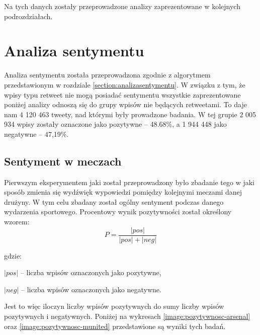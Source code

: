 Na tych danych zostały przeprowadzone analizy zaprezentowane w kolejnych podrozdziałach.













\section{Analiza sentymentu}
\label{section:analizasentymentu2}

Analiza sentymentu została przeprowadzona zgodnie z algorytmem przedstawionym w
rozdziale \ref{section:analizasentymentu}. W związku z tym, że wpisy typu
retweet nie mogą posiadać sentymentu wszystkie zaprezentowane poniżej analizy
odnoszą się do grupy wpisów nie będących retweetami. To daje nam 4 120 463
tweety, nad którymi były prowadzone badania. W tej grupie 2 005 934 wpisy
zostały oznaczone jako pozytywne -- 48.68\%, a 1 944 448 jako negatywne --
47,19\%.



\subsection{Sentyment w meczach}
Pierwszym eksperymentem jaki został przeprowadzony było zbadanie tego w jaki 
sposób zmienia się wydźwięk wypowiedzi pomiędzy kolejnymi meczami danej drużyny.
W tym celu zbadany został ogólny sentyment podczas danego wydarzenia sportowego.
Procentowy wynik pozytywności został określony wzorem:
\begin{equation}
P = \frac{|pos|}{|pos| + |neg|}
\end{equation}

gdzie:

$|pos|$ -- liczba wpisów oznaczonych jako pozytywne,

$|neg|$ -- liczba wpisów oznaczonych jako negatywne.

Jest to więc iloczyn liczby wpisów 
pozytywnych do sumy liczby wpisów pozytywnych i negatywnych. 
Poniżej na wykresach \ref{image:pozytywnosc-arsenal} oraz 
\ref{image:pozytywnosc-munited} przedstawione są wyniki tych badań.

